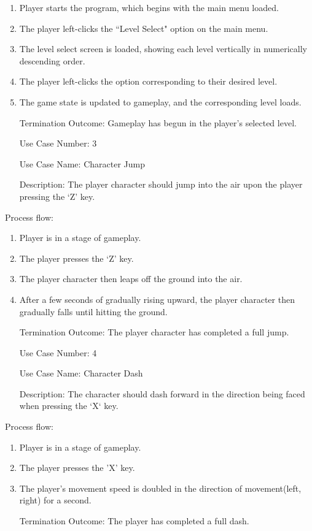 \documentclass[10pt,conference,onecolumn,compsoc]{IEEEtran}
\begin{document}
\begin{enumerate}
\item Player starts the program, which begins with the main menu loaded.
\item The player left-clicks the ``Level Select" option on the main menu.
\item The level select screen is loaded, showing each level vertically in numerically descending order.
\item The player left-clicks the option corresponding to their desired level.
\item The game state is updated to gameplay, and the corresponding level loads.
\item[Termination Outcome:] Gameplay has begun in the player's selected level.
\end{enumerate}

\begin{itemize}
\item[Use Case Number:] 3
\item[Use Case Name:] Character Jump
\item[Description:] The player character should jump into the air upon the player pressing the `Z' key.
\end{itemize}

Process flow:

\begin{enumerate}
\item Player is in a stage of gameplay.
\item The player presses the `Z' key.
\item The player character then leaps off the ground into the air.
\item After a few seconds of gradually rising upward, the player character then gradually falls until hitting the ground.
\item[Termination Outcome:] The player character has completed a full jump.
\end{enumerate}

\begin{itemize}
\item[Use Case Number:] 4
\item[Use Case Name:] Character Dash
\item[Description:] The character should dash forward in the direction being faced when pressing the `X` key.
\end{itemize}

Process flow:

\begin{enumerate}
\item Player is in a stage of gameplay.
\item The player presses the 'X' key.
\item The player's movement speed is doubled in the direction of movement(left, right) for a second.
\item[Termination Outcome:] The player has completed a full dash.
\end{enumerate}
\end{document}

